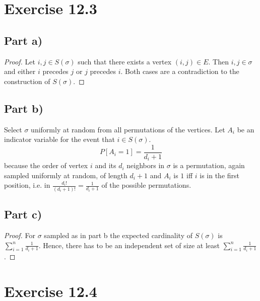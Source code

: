 \documentclass[10pt,a4paper]{article}
\begin{document}
\section*{Exercise 12.3}

\subsection*{Part a)}

\begin{proof}
  Let $i, j \in S(\sigma)$ such that there exists a vertex $(i, j) \in E$.
  Then $i, j \in \sigma$ and either $i$ precedes $j$ or $j$ precedes $i$.
  Both cases are a contradiction to the construction of $S(\sigma)$.
\end{proof}

\subsection*{Part b)}

Select $\sigma$ uniformly at random from all permutations of the vertices.
Let $A_{i}$ be an indicator variable for the event that $i \in S(\sigma)$.
\begin{equation*}
  P[A_{i} = 1] = \frac{1}{d_{i} + 1}
\end{equation*}
because the order of vertex $i$ and its $d_{i}$ neighbors in $\sigma$ is a permutation, again sampled uniformly at random, of length $d_{i} + 1$ and $A_{i}$ is $1$ iff $i$ is in the first position, i.e. in $\frac{d_{i}!}{(d_{i} + 1)!} = \frac{1}{d_{i} + 1}$ of the possible permutations.

\subsection*{Part c)}

\begin{proof}
  For $\sigma$ sampled as in part b the expected cardinality of $S(\sigma)$ is $\sum_{i = 1}^{n} \frac{1}{d_{i} + 1}$.
  Hence, there has to be an independent set of size at least $\sum_{i = 1}^{n} \frac{1}{d_{i} + 1}$.
\end{proof}

\section*{Exercise 12.4}
\end{document}
